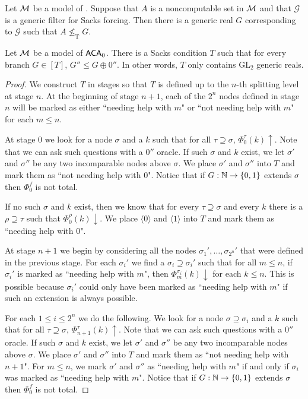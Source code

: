 \begin{cor}
Let $\mathcal{M}$ be a model of \ACAo.
Suppose that $A$ is a noncomputable set in $\mathcal{M}$
and that $\mathcal{G}$ is a generic filter for Sacks forcing.
Then there is a generic real $G$ corresponding to $\mathcal{G}$
such that $A\not\leq_{\text{T}}G$.
\end{cor}

\begin{prop}\label{P:Sk:GL2generic}
Let $\mathcal{M}$ be a model of $\mathsf{ACA}_0$.
There is a Sacks condition $T$ such that for every branch $G\in[T]$,
$G''\leq G\oplus0''$.  In other words, $T$ only contains GL$_2$ generic reals.
\end{prop}

\begin{proof}
We construct $T$ in stages so that $T$ is defined up to the $n$-th splitting level at stage $n$.
At the beginning of stage $n+1$, each of the $2^n$ nodes defined in stage $n$
will be marked as either ``needing help with $m$" or ``not needing help with $m$" for each $m\leq n$.

At stage 0 we look for a node $\sigma$ and a $k$
such that for all $\tau\supseteq\sigma$, $\Phi_0^\tau(k)\uparrow$.
Note that we can ask such questions with a $0''$ oracle.
If such $\sigma$ and $k$ exist, we let $\sigma'$ and $\sigma''$
be any two incomparable nodes above $\sigma$.
We place $\sigma'$ and $\sigma''$
into $T$ and mark them as ``not needing help with 0".
Notice that if $G:\mathbb{N}\to\{0,1\}$ extends $\sigma$
then $\Phi_0^f$ is not total.

If no such $\sigma$ and $k$ exist, then we know
that for every $\tau\supseteq\sigma$ and every $k$
there is a $\rho\supseteq\tau$ such that $\Phi_0^\rho(k)\downarrow$.
We place $\langle 0\rangle$ and $\langle 1\rangle$
into $T$ and mark them as ``needing help with 0".

At stage $n+1$ we begin by considering all the nodes
$\sigma_1',\ldots,\sigma_{2^{n}}'$ that were defined in the previous stage.
For each $\sigma_i'$ we find a $\sigma_i\supseteq\sigma_i'$ such
that for all $m\leq n$, if $\sigma_i'$ is marked as
``needing help with $m$", then $\Phi_m^{\sigma_i}(k)\downarrow$
for each $k\leq n$.
This is possible because $\sigma_i'$ could only have been
marked as ``needing help with $m$" if such an extension
is always possible.

For each $1\leq i\leq 2^n$ we do the following.
We look for a node $\sigma\supseteq\sigma_i$ and a $k$
such that for all $\tau\supseteq\sigma$, $\Phi_{n+1}^\tau(k)\uparrow$.
Note that we can ask such questions with a $0''$ oracle.
If such $\sigma$ and $k$ exist, we let $\sigma'$ and $\sigma''$
be any two incomparable nodes above $\sigma$.
We place $\sigma'$ and $\sigma''$
into $T$ and mark them as ``not needing help with $n+1$".
For $m\leq n$, we mark $\sigma'$ and $\sigma''$
as ``needing help with $m$" if and only if $\sigma_i$
was marked as ``needing help with $m$".
Notice that if $G:\mathbb{N}\to\{0,1\}$ extends $\sigma$
then $\Phi_0^f$ is not total.


\end{proof}
